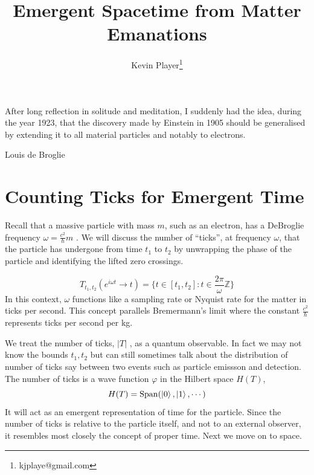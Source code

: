 \documentclass[12pt,a4paper]{article}
\begin{document}
\title{Emergent Spacetime from Matter Emanations}
\author[1]{Kevin Player\footnote{kjplaye@gmail.com}}

\maketitle


\epigraph{After long reflection in solitude and meditation, I suddenly had the idea, during the year 1923, that the discovery made by Einstein in 1905 should be generalised by extending it to all material particles and notably to electrons.}{Louis de Broglie}


 
\section{Counting Ticks for Emergent Time}

Recall that a massive particle with mass $m$, such as an electron, has a DeBroglie frequency $\omega = \frac{c^2}{\hslash} m$ \cite{debroglie}. We will discuss the number of ``ticks'', at frequency $\omega$, that the particle has undergone from time $t_1$ to $t_2$ by unwrapping the phase of the particle and identifying the lifted zero crossings.

\[
    T_{t_1,t_2}(e^{i \omega t} \rightarrow t) = \{ t \in [t_1,t_2]: t \in \frac{2 \pi}{\omega} \mathbb{Z} \}
\]
In this context, $\omega$ functions like a sampling rate or Nyquist rate for the matter in ticks per second.  This concept parallels Bremermann's limit where the constant $\frac{c^2}{\hslash}$ represents ticks per second per kg.  


We treat the number of ticks, $|T|$ , as a quantum observable.  In fact we may not know the bounds $t_1,t_2$ but can still sometimes talk about the distribution of number of ticks say between two events such as particle emissson and detection.  The number of ticks is a wave function $\varphi$ in the Hilbert space $H(T)$,
\[
   H(T) = \mathrm{Span}(\ket{0}, \ket{1}, \cdots)
\]
It will act as an emergent representation of time for the particle. Since the number of ticks is relative to the particle itself, and not to an external observer, it resembles most closely the concept of proper time.  Next we move on to space.
\end{document}
